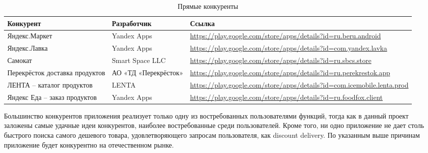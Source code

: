 \documentclass[a4paper,12pt,reqno]{article}
\begin{document}
  \begin{table}[h!]
    \caption{Прямые конкуренты}
    \begin{tabularx}{\textwidth}{|p{3.5cm}|p{3cm}|X|}
      \hline
      Конкурент & Разработчик & Ссылка \\\hline
      Яндекс.Маркет & Yandex Apps & \url{https://play.google.com/store/apps/details?id=ru.beru.android} \\\hline
      Яндекс.Лавка & Yandex Apps & \url{https://play.google.com/store/apps/details?id=com.yandex.lavka} \\\hline
      Самокат & Smart Space LLC & \url{https://play.google.com/store/apps/details?id=ru.sbcs.store} \\\hline
      Перекрёсток доставка продуктов & АО «ТД «Перекрёсток» & \url{https://play.google.com/store/apps/details?id=ru.perekrestok.app} \\\hline
      ЛЕНТА -- каталог продуктов & LENTA & \url{https://play.google.com/store/apps/details?id=com.icemobile.lenta.prod} \\\hline
      Яндекс Еда -- заказ продуктов & Yandex Apps & \url{https://play.google.com/store/apps/details?id=ru.foodfox.client} \\\hline
    \end{tabularx}
  \end{table}

  Большинство конкурентов приложения реализует только одну из востребованных пользователями функций, тогда как в данный проект заложены самые удачные идеи конкурентов, наиболее востребованные среди пользователей.
  Кроме того, ни одно приложение не дает столь быстрого поиска самого дешевого товара, удовлетворяющего запросам пользователя, как discount delivery.
  По указанным выше причинам приложение будет конкурентно на отечественном рынке.
\end{document}
